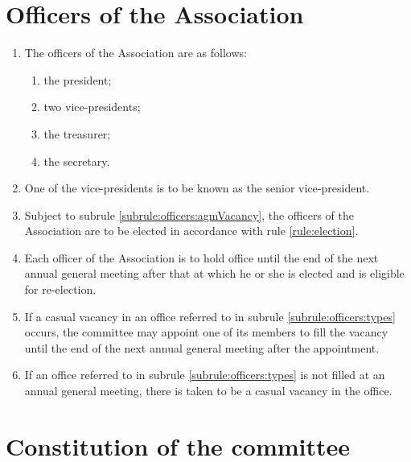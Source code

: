 \documentclass[a4paper,11pt]{article}
\begin{document}
\section{Officers of the Association}
\label{rule:officers}

\begin{enumerate}
	\item \label{subrule:officers:types} The officers of the Association are as follows:
	\begin{enumerate}
		\item the president;
		\item two vice-presidents;
		\item the treasurer;
		\item the secretary.
	\end{enumerate}
	
	\item One of the vice-presidents is to be known as the senior vice-president.
	\item Subject to subrule \ref{subrule:officers:agmVacancy}, the officers of the Association are to be elected in accordance with rule \ref{rule:election}.
	\item Each officer of the Association is to hold office until the end of the next annual general meeting after that at which he or she is elected and is eligible for re-election.
	\item \label{subrule:officers:casualVacancy} If a casual vacancy in an office referred to in subrule \ref{subrule:officers:types} occurs, the committee may appoint one of its members to fill the vacancy until the end of the next annual general meeting after the appointment.
	\item \label{subrule:officers:agmVacancy} If an office referred to in subrule \ref{subrule:officers:types} is not filled at an annual general meeting, there is taken to be a casual vacancy in the office.
\end{enumerate}

\section{Constitution of the committee}
\label{rule:committeeConstitution}
\end{document}
